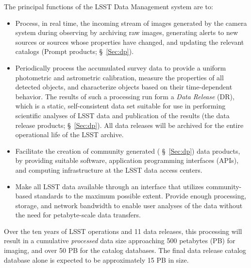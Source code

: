 The principal functions of the LSST Data Management system are to:
\begin{itemize}
\item Process, in real time, the incoming stream of images generated by the camera system during observing by archiving raw images, generating alerts to new sources or sources whose properties have changed, and updating the relevant catalogs (Prompt  products; \S~\ref{Sec:dp}).
\item Periodically process the accumulated survey data to provide a
  uniform photometric and astrometric calibration, measure the
  properties of all detected objects, and characterize objects based on their time-dependent behavior. The results of such a processing run form a {\em Data Release} (DR), which is a static, self-consistent data set suitable for use in performing scientific analyses of LSST data and publication of the results (the data release products; \S~\ref{Sec:dp}). All data releases will be archived for the entire operational life of the LSST archive.
\item Facilitate the creation of community generated (
  \S~\ref{Sec:dp}) data products, by providing suitable software,
  application programming interfaces (APIs),
and computing infrastructure at the LSST data access centers.
\item Make all LSST data available through an interface that utilizes
community-based standards   to the maximum possible extent. Provide
  enough processing, storage, and network bandwidth to enable user
  analyses of the data without the need for petabyte-scale data
  transfers.
\end{itemize}

Over the ten years of LSST operations and 11 data releases, this processing will result in a cumulative {\em processed} data size
approaching 500 petabytes (PB) for imaging, and over 50 PB for the
catalog databases. The final data release catalog database alone is expected
to be approximately 15 PB in size.
\\


